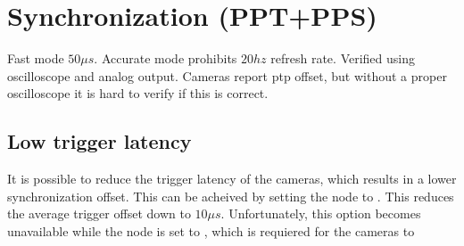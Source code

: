 \section{Synchronization (PPT+PPS)}
Fast mode \approx $50\mu s$. Accurate mode prohibits $20hz$ refresh rate.
Verified using oscilloscope and analog output.
Cameras report ptp offset, but without a proper oscilloscope it is hard to verify if this is correct.

\subsection{Low trigger latency}
It is possible to reduce the trigger latency of the cameras, which results in a lower synchronization offset.
This can be acheived by setting the  node to .
This reduces the average trigger offset down to $10\mu s$.
Unfortunately, this option becomes unavailable while the  node is set to , which is requiered for the cameras to


